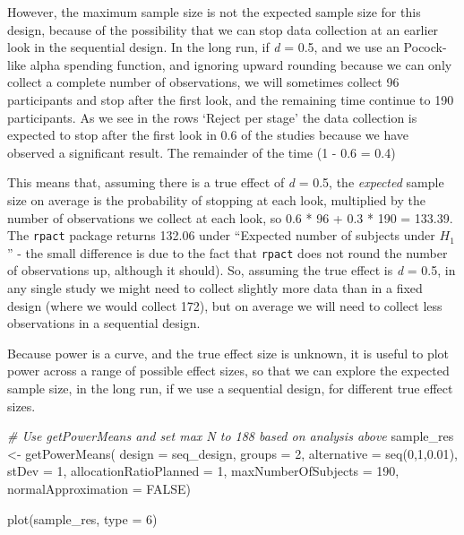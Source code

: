 \documentclass[
  oneside]{book}
\newenvironment{Shaded}{\begin{snugshade}}{\end{snugshade}}
\newcommand{\AttributeTok}[1]{\textcolor[rgb]{0.77,0.63,0.00}{#1}}
\newcommand{\CommentTok}[1]{\textcolor[rgb]{0.56,0.35,0.01}{\textit{#1}}}
\newcommand{\ConstantTok}[1]{\textcolor[rgb]{0.00,0.00,0.00}{#1}}
\newcommand{\DecValTok}[1]{\textcolor[rgb]{0.00,0.00,0.81}{#1}}
\newcommand{\FloatTok}[1]{\textcolor[rgb]{0.00,0.00,0.81}{#1}}
\newcommand{\FunctionTok}[1]{\textcolor[rgb]{0.00,0.00,0.00}{#1}}
\newcommand{\NormalTok}[1]{#1}
\newcommand{\OtherTok}[1]{\textcolor[rgb]{0.56,0.35,0.01}{#1}}
\begin{document}
However, the maximum sample size is not the expected sample size for this design, because of the possibility that we can stop data collection at an earlier look in the sequential design. In the long run, if \emph{d} = 0.5, and we use an Pocock-like alpha spending function, and ignoring upward rounding because we can only collect a complete number of observations, we will sometimes collect 96 participants and stop after the first look, and the remaining time continue to 190 participants. As we see in the rows `Reject per stage' the data collection is expected to stop after the first look in 0.6 of the studies because we have observed a significant result. The remainder of the time (1 - 0.6 = 0.4)

This means that, assuming there is a true effect of \emph{d} = 0.5, the \emph{expected} sample size on average is the probability of stopping at each look, multiplied by the number of observations we collect at each look, so 0.6 * 96 + 0.3 * 190 = 133.39. The \texttt{rpact} package returns 132.06 under ``Expected number of subjects under \(H_1\)'' - the small difference is due to the fact that \texttt{rpact} does not round the number of observations up, although it should). So, assuming the true effect is \emph{d} = 0.5, in any single study we might need to collect slightly more data than in a fixed design (where we would collect 172), but on average we will need to collect less observations in a sequential design.

Because power is a curve, and the true effect size is unknown, it is useful to plot power across a range of possible effect sizes, so that we can explore the expected sample size, in the long run, if we use a sequential design, for different true effect sizes.

\begin{Shaded}
\begin{Highlighting}[]
\CommentTok{\# Use getPowerMeans and set max N to 188 based on analysis above}
\NormalTok{sample\_res }\OtherTok{\textless{}{-}} \FunctionTok{getPowerMeans}\NormalTok{(}
  \AttributeTok{design =}\NormalTok{ seq\_design,}
  \AttributeTok{groups =} \DecValTok{2}\NormalTok{,}
  \AttributeTok{alternative =} \FunctionTok{seq}\NormalTok{(}\DecValTok{0}\NormalTok{,}\DecValTok{1}\NormalTok{,}\FloatTok{0.01}\NormalTok{), }
  \AttributeTok{stDev =} \DecValTok{1}\NormalTok{, }
  \AttributeTok{allocationRatioPlanned =} \DecValTok{1}\NormalTok{,}
  \AttributeTok{maxNumberOfSubjects =} \DecValTok{190}\NormalTok{, }
  \AttributeTok{normalApproximation =} \ConstantTok{FALSE}\NormalTok{)}

\FunctionTok{plot}\NormalTok{(sample\_res, }\AttributeTok{type =} \DecValTok{6}\NormalTok{)}
\end{Highlighting}
\end{Shaded}
\end{document}
